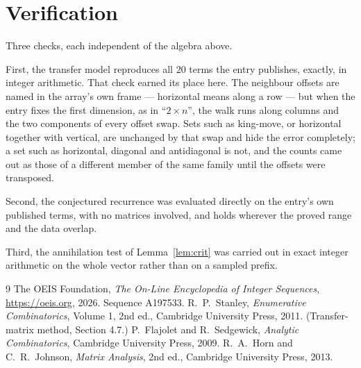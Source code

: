 \documentclass[11pt,a4paper]{article}
\theoremstyle{plain}
\theoremstyle{definition}
\begin{document}
\section{Verification}

Three checks, each independent of the algebra above.

First, the transfer model reproduces all $20$ terms the entry publishes, exactly, in
integer arithmetic. That check earned its place here. The neighbour offsets are named in the
array's own frame --- horizontal means along a row --- but when the entry fixes the first
dimension, as in ``$2\times n$'', the walk runs along columns and the two components of every
offset swap. Sets such as king-move, or horizontal together with vertical, are unchanged by
that swap and hide the error completely; a set such as horizontal, diagonal and antidiagonal
is not, and the counts came out as those of a different member of the same family until the
offsets were transposed.

Second, the conjectured recurrence was evaluated directly on the entry's own published terms,
with no matrices involved, and holds wherever the proved range and the data overlap.

Third, the annihilation test of Lemma~\ref{lem:crit} was carried out in exact integer
arithmetic on the whole vector rather than on a sampled prefix.

\begin{thebibliography}{9}
 The OEIS Foundation, \emph{The On-Line Encyclopedia of Integer
Sequences}, \url{https://oeis.org}, 2026. Sequence A197533.
 R.~P.~Stanley, \emph{Enumerative Combinatorics}, Volume 1, 2nd ed.,
Cambridge University Press, 2011. (Transfer-matrix method, Section 4.7.)
 P.~Flajolet and R.~Sedgewick, \emph{Analytic Combinatorics}, Cambridge
University Press, 2009.
 R.~A.~Horn and C.~R.~Johnson, \emph{Matrix Analysis}, 2nd ed., Cambridge
University Press, 2013.
\end{thebibliography}
\end{document}
